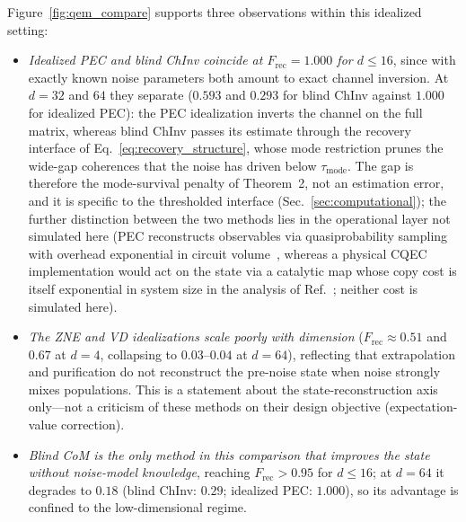 \documentclass[pra,twocolumn,superscriptaddress,longbibliography,floatfix,nofootinbib]{revtex4-2}
\newcommand{\Frec}{F_\mathrm{rec}}
\begin{document}
Figure~\ref{fig:qem_compare} supports three observations within this idealized setting:
\begin{itemize}
\item \emph{Idealized PEC and blind ChInv coincide at $\Frec = 1.000$ for $d \leq 16$}, since with exactly known noise parameters both amount to exact channel inversion.
At $d = 32$ and $64$ they separate ($0.593$ and $0.293$ for blind ChInv against $1.000$ for idealized PEC): the PEC idealization inverts the channel on the full matrix, whereas blind ChInv passes its estimate through the recovery interface of Eq.~\eqref{eq:recovery_structure}, whose mode restriction prunes the wide-gap coherences that the noise has driven below $\tau_\mathrm{mode}$.
The gap is therefore the mode-survival penalty of Theorem~2, not an estimation error, and it is specific to the thresholded interface (Sec.~\ref{sec:computational}); the further distinction between the two methods lies in the operational layer not simulated here (PEC reconstructs observables via quasiprobability sampling with overhead exponential in circuit volume~\cite{Temme2017,Endo2018,Takagi2022limits,Quek2024tighter}, whereas a physical CQEC implementation would act on the state via a catalytic map whose copy cost is itself exponential in system size in the analysis of Ref.~\cite{Wakaura2026unified}; neither cost is simulated here).
\item \emph{The ZNE and VD idealizations scale poorly with dimension} ($\Frec \approx 0.51$ and $0.67$ at $d = 4$, collapsing to $0.03$--$0.04$ at $d = 64$), reflecting that extrapolation and purification do not reconstruct the pre-noise state when noise strongly mixes populations.
This is a statement about the state-reconstruction axis only---not a criticism of these methods on their design objective (expectation-value correction).
\item \emph{Blind CoM is the only method in this comparison that improves the state without noise-model knowledge}, reaching $\Frec > 0.95$ for $d \leq 16$; at $d = 64$ it degrades to $0.18$ (blind ChInv: $0.29$; idealized PEC: $1.000$), so its advantage is confined to the low-dimensional regime.
\end{itemize}
\end{document}

